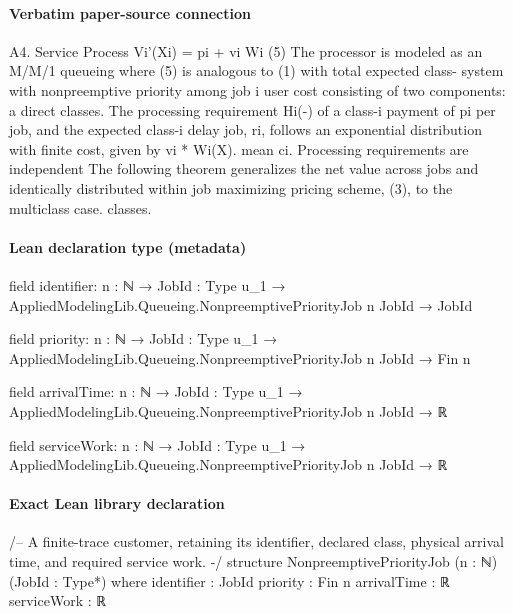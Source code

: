 \documentclass[10pt]{article}
\begin{document}
\paragraph{Verbatim paper-source connection}
\begin{ReviewVerbatim}
A4. Service Process                                                      Vi'(Xi) = pi + vi Wi (5)
The processor is modeled as an M/M/1 queueing                          where (5) is analogous to (1) with total expected class-
system with nonpreemptive priority among job                           i user cost consisting of two components: a direct
classes. The processing requirement Hi(-) of a class-i                 payment of pi per job, and the expected class-i delay
job, ri, follows an exponential distribution with finite cost, given by vi * Wi(X).
mean ci. Processing requirements are independent           The following theorem generalizes the net value
across jobs and identically distributed within job       maximizing pricing scheme, (3), to the multiclass case.
classes.
\end{ReviewVerbatim}



\paragraph{Lean declaration type (metadata)}
\begin{ReviewVerbatim}
field identifier:
{n : ℕ} → {JobId : Type u_1} → AppliedModelingLib.Queueing.NonpreemptivePriorityJob n JobId → JobId

field priority:
{n : ℕ} → {JobId : Type u_1} → AppliedModelingLib.Queueing.NonpreemptivePriorityJob n JobId → Fin n

field arrivalTime:
{n : ℕ} → {JobId : Type u_1} → AppliedModelingLib.Queueing.NonpreemptivePriorityJob n JobId → ℝ

field serviceWork:
{n : ℕ} → {JobId : Type u_1} → AppliedModelingLib.Queueing.NonpreemptivePriorityJob n JobId → ℝ
\end{ReviewVerbatim}

\paragraph{Exact Lean library declaration}
\begin{ReviewVerbatim}
/-- A finite-trace customer, retaining its identifier, declared class,
physical arrival time, and required service work. -/
structure NonpreemptivePriorityJob (n : ℕ) (JobId : Type*) where
  identifier : JobId
  priority : Fin n
  arrivalTime : ℝ
  serviceWork : ℝ
\end{ReviewVerbatim}
\end{document}
